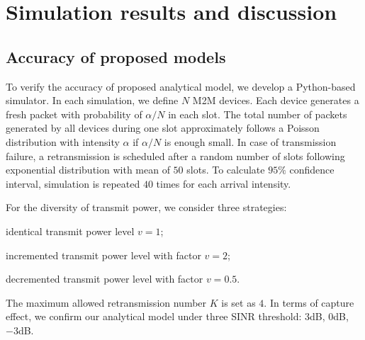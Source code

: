 \section{Simulation results and discussion}
\label{sec:simulation_result}
%
\subsection{Accuracy of proposed models}
To verify the accuracy of proposed analytical model, we develop a Python-based simulator. In each simulation, we define $N$ M2M devices. Each device generates a fresh packet with probability of $\alpha/N$ in each slot. The total number of packets generated by all devices during one slot approximately follows a Poisson distribution with intensity $\alpha$ if $\alpha/N$ is enough small. In case of transmission failure, a retransmission is scheduled after a random number of slots following exponential distribution with mean of $50$ slots. To calculate $95\%$ confidence interval, simulation is repeated $40$ times for each arrival intensity.

For the diversity of transmit power, we consider three strategies: \begin{inparaenum}[1)]
	\item identical transmit power level $v=1$; 
	\item incremented transmit power level with factor $v=2$;
	\item decremented transmit power level with factor $v=0.5$.
\end{inparaenum}
The maximum allowed retransmission number $K$ is set as $4$. In terms of capture effect, we confirm our analytical model under three SINR threshold: $3$dB, $0$dB, $-3$dB.  

